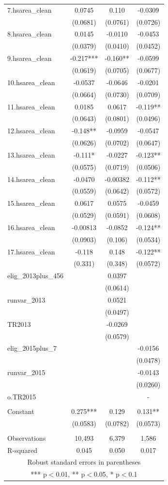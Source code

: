 \documentclass[]{article}
\begin{document}
\begin{tabular}{lccc}
7.hsarea\_clean & 0.0745 & 0.110 & -0.0309 \\
 & (0.0681) & (0.0761) & (0.0726) \\
8.hsarea\_clean & 0.0145 & -0.0110 & -0.0453 \\
 & (0.0379) & (0.0410) & (0.0452) \\
9.hsarea\_clean & -0.217*** & -0.160** & -0.0599 \\
 & (0.0619) & (0.0705) & (0.0677) \\
10.hsarea\_clean & -0.0537 & -0.0646 & -0.0201 \\
 & (0.0664) & (0.0730) & (0.0709) \\
11.hsarea\_clean & 0.0185 & 0.0617 & -0.119** \\
 & (0.0643) & (0.0801) & (0.0496) \\
12.hsarea\_clean & -0.148** & -0.0959 & -0.0547 \\
 & (0.0626) & (0.0702) & (0.0647) \\
13.hsarea\_clean & -0.111* & -0.0227 & -0.123** \\
 & (0.0575) & (0.0719) & (0.0506) \\
14.hsarea\_clean & -0.0470 & -0.00382 & -0.112** \\
 & (0.0559) & (0.0642) & (0.0572) \\
15.hsarea\_clean & 0.0617 & 0.0575 & -0.0459 \\
 & (0.0529) & (0.0591) & (0.0608) \\
16.hsarea\_clean & -0.00813 & -0.0852 & -0.124** \\
 & (0.0903) & (0.106) & (0.0534) \\
17.hsarea\_clean & -0.118 & 0.148 & -0.122** \\
 & (0.331) & (0.348) & (0.0572) \\
elig\_2013plus\_456 &  & 0.0397 &  \\
 &  & (0.0614) &  \\
runvar\_2013 &  & 0.0521 &  \\
 &  & (0.0497) &  \\
TR2013 &  & -0.0269 &  \\
 &  & (0.0579) &  \\
elig\_2015plus\_7 &  &  & -0.0156 \\
 &  &  & (0.0478) \\
runvar\_2015 &  &  & -0.0143 \\
 &  &  & (0.0260) \\
o.TR2015 &  &  & - \\
 &  &  &  \\
Constant & 0.275*** & 0.129 & 0.131** \\
 & (0.0583) & (0.0782) & (0.0573) \\
 &  &  &  \\
Observations & 10,493 & 6,379 & 1,586 \\
 R-squared & 0.045 & 0.050 & 0.017 \\ \hline
\multicolumn{4}{c}{ Robust standard errors in parentheses} \\
\multicolumn{4}{c}{ *** p$<$0.01, ** p$<$0.05, * p$<$0.1} \\
\end{tabular}
\end{document}
